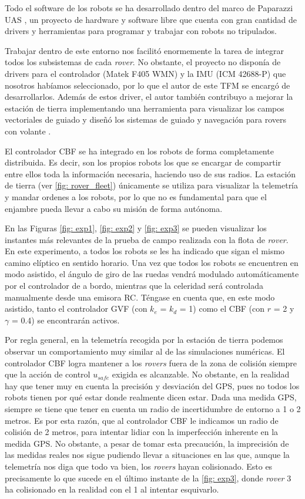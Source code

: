 Todo el software de los robots se ha desarrollado dentro del marco de Paparazzi UAS \cite{paparazzi}, un proyecto de hardware y software libre que cuenta con gran cantidad de drivers y herramientas para programar y trabajar con robots no tripulados.

Trabajar dentro de este entorno nos facilitó enormemente la tarea de integrar todos los subsistemas de cada \textit{rover}. No obstante, el proyecto no disponía de drivers para el controlador (Matek F405 WMN) y la IMU (ICM 42688-P) que nosotros habíamos seleccionado, por lo que el autor de este TFM se encargó de desarrollarlos. Además de estos driver, el autor también contribuyo a mejorar la estación de tierra implementando una herramienta para visualizar los campos vectoriales de guiado \cite{pull_gcs} y diseñó los sistemas de guiado y navegación para rovers con volante \cite{pull_sr}.

El controlador CBF se ha integrado en los robots de forma completamente distribuida. Es decir, son los propios robots los que se encargar de compartir entre ellos toda la información necesaria, haciendo uso de sus radios. La estación de tierra (ver \autoref{fig: rover_fleet}) únicamente se utiliza para visualizar la telemetría y mandar ordenes a los robots, por lo que no es fundamental para que el enjambre pueda llevar a cabo su misión de forma autónoma.

\newpage

En las Figuras \ref{fig: exp1}, \ref{fig: exp2} y \ref{fig: exp3} se pueden visualizar los instantes más relevantes de la prueba de campo realizada con la flota de \textit{rover}. En este experimento, a todos los robots se les ha indicado que sigan el mismo camino elíptico en sentido horario. Una vez que todos los robots se encuentren en modo asistido, el ángulo de giro de las ruedas vendrá modulado automáticamente por el controlador de a bordo, mientras que la celeridad será controlada manualmente desde una emisora RC. Téngase en cuenta que, en este modo asistido, tanto el controlador GVF (con $k_e$ = $k_d$ = 1) como el CBF (con $r$ = 2 y $\gamma$ = 0.4) se encontrarán activos. 

Por regla general, en la telemetría recogida por la estación de tierra podemos observar un comportamiento muy similar al de las simulaciones numéricas. El controlador CBF logra mantener a los \textit{rovers} fuera de la zona de colisión siempre que la acción de control $u_{safe}$ exigida es alcanzable. No obstante, en la realidad hay que tener muy en cuenta la precisión y desviación del GPS, pues no todos los robots tienen por qué estar donde realmente dicen estar. Dada una medida GPS, siempre se tiene que tener en cuenta un radio de incertidumbre de entorno a 1 o 2 metros. Es por esta razón, que al controlador CBF le indicamos un radio de colisión de 2 metros, para intentar lidiar con la imperfección inherente en la medida GPS. No obstante, a pesar de tomar esta precaución, la imprecisión de las medidas reales nos sigue pudiendo llevar a situaciones en las que, aunque la telemetría nos diga que todo va bien, los \textit{rovers} hayan colisionado. Esto es precisamente lo que sucede en el último instante de la \autoref{fig: exp3}, donde \textit{rover} 3 ha colisionado en la realidad con el 1 al intentar esquivarlo.

